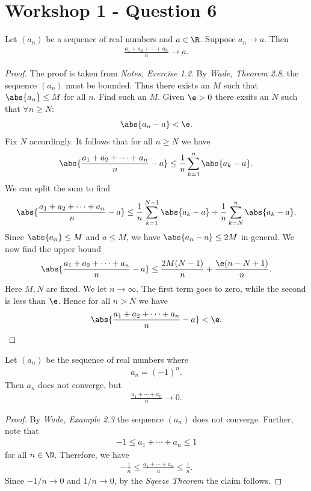 \documentclass{article}
\begin{document}
\section{Workshop 1 - Question 6}

\begin{claim}
	Let $(a_n)$ be a sequence of real numbers and $a\in\R$. Suppose
	$a_n\to a$. Then
	\begin{align*}
		\frac{a_1 + a_2 + \cdots + a_n}{n}\to a.
	\end{align*}
	\begin{proof}
		The proof is taken from \emph{Notes, Exercise 1.2}.
		By \emph{Wade, Theorem 2.8}, the sequence $(a_n)$ must be bounded.
		Thus there exists an $M$ such that $\abs{a_n}\leq M$ for all $n$.
		Find such an $M$.
		Given $\e > 0$ there exsits an $N$ such that $\forall n \geq N$:
		\begin{align*}
			\abs{a_n - a} < \e.
		\end{align*}
		Fix $N$ accordingly. It follows that for all $n\geq N$ we have
		\begin{align*}
			\abs{\frac{a_1 + a_2 + \cdots + a_n}{n}-a} \leq
			\frac{1}{n}\sum_{k=1}^n \abs{a_k - a}.
		\end{align*}
		We can split the sum to find
		\begin{align*}
			\abs{\frac{a_1 + a_2 + \cdots + a_n}{n}-a} \leq
			\frac{1}{n}\sum_{k=1}^{N-1} \abs{a_k - a} + \frac{1}{n}\sum_{k=N}^n \abs{a_k-a}.
		\end{align*}
		Since $\abs{a_n}\leq M$ and $a\leq M$, we have $\abs{a_n-a}\leq 2M$ in general.
		We now find the upper bound
		\begin{align*}
			\abs{\frac{a_1 + a_2 + \cdots + a_n}{n}-a} \leq
			\frac{2M(N-1)}{n} + \frac{\e(n-N+1)}{n}.
		\end{align*}
		Here $M,N$ are fixed. We let $n\to\infty$. The first term goes to zero, while
		the second is less than $\e$. Hence for all $n>N$ we have
		\begin{align*}
			\abs{\frac{a_1 + a_2 + \cdots + a_n}{n}-a} < \e.
		\end{align*}
	\end{proof}
\end{claim}
\begin{claim}
	Let $(a_n)$ be the sequence of real numbers
	where
	\begin{align*}
		a_n = (-1)^n.
	\end{align*}
	Then $a_n$ does not converge, but
	\begin{align*}
		\frac{a_1+\cdots+a_n}{n} \to 0.
	\end{align*}
	\begin{proof}
		By \emph{Wade, Example 2.3} the sequence $(a_n)$ does not converge.
		Further, note that
		\begin{align*}
			-1 \leq a_1 + \cdots + a_n \leq 1
		\end{align*}
		for all $n\in\N$. Therefore, we have
		\begin{align*}
			-\frac{1}{n}\leq \frac{a_1+\cdots+a_n}{n} \leq \frac{1}{n}.
		\end{align*}
		Since $-1/n\to 0$ and $1/n\to 0$, by the \emph{Sqeeze Theorem} the claim follows.
	\end{proof}
\end{claim}
\end{document}
